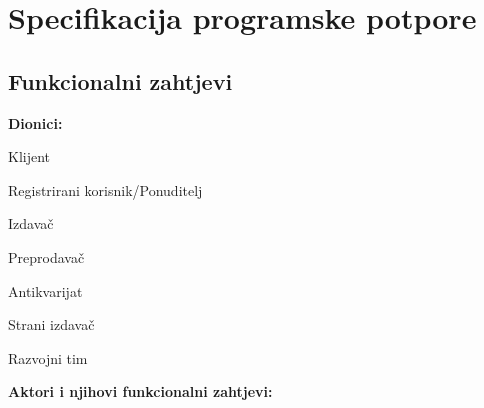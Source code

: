 \chapter{Specifikacija programske potpore}
		
	\section{Funkcionalni zahtjevi}
			
			\noindent \textbf{Dionici:}
			
			\begin{packed_enum}
				
				\item Klijent
				\item Registrirani korisnik/Ponuditelj		
				\begin{packed_enum}
                    			\item Izdavač
                    			\item Preprodavač
                    			\item Antikvarijat
                		\end{packed_enum}
                		\item Strani izdavač
                		\item Razvojni tim
    
				\end{packed_enum}
			
			\noindent \textbf{Aktori i njihovi funkcionalni zahtjevi:}
			
